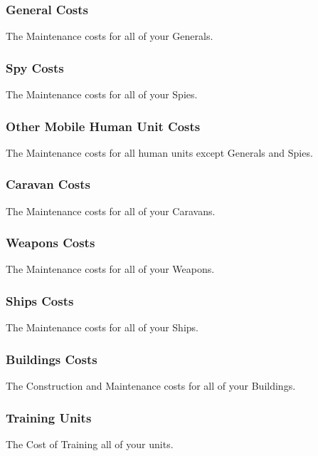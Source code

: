 
\subsubsection{General Costs}

The Maintenance costs for all of your Generals.

\subsubsection{Spy Costs}

The Maintenance costs for all of your Spies.

\subsubsection{Other Mobile Human Unit Costs}

The Maintenance costs for all human units except Generals and Spies.

\subsubsection{Caravan Costs}

The Maintenance costs for all of your Caravans.

\subsubsection{Weapons Costs}

The Maintenance costs for all of your Weapons.

\subsubsection{Ships Costs}

The Maintenance costs for all of your Ships.

\subsubsection{Buildings Costs}

The Construction and Maintenance costs for all of your Buildings.

\subsubsection{Training Units}

The Cost of Training all of your units.

